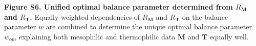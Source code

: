 \documentclass{report}
\begin{document}
{\bf Figure S6. Unified optimal balance parameter determined from $R_{\mathbf{M}}$ and $R_{\mathbf{T}}$.} Equally weighted dependencies of $R_{\mathbf{M}}$ and $R_{\mathbf{T}}$ on the balance parameter $\mathit{w}$ are combined to determine the unique optimal balance parameter $\mathit{w}_{op}$, explaining both mesophilic and thermophilic data $\mathbf{M}$ and $\mathbf{T}$ equally well.


\begin{figure}[h!]
	\centering
\end{figure}
\end{document}
